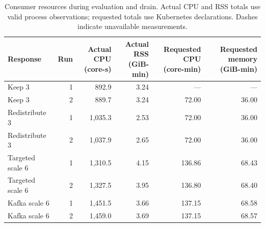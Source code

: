 \begin{table}[!htbp]
\centering\small
\setlength{\tabcolsep}{3pt}
\renewcommand{\arraystretch}{1.12}
\begin{tabular}{@{}lrrrrr@{}}
\toprule
Response & Run & \shortstack{Actual CPU\\(core-s)} & \shortstack{Actual RSS\\(GiB-min)} & \shortstack{Requested CPU\\(core-min)} & \shortstack{Requested memory\\(GiB-min)}\\
\midrule
Keep 3 & 1 & 892.9 & 3.24 & --- & ---\\
Keep 3 & 2 & 889.7 & 3.24 & 72.00 & 36.00\\
Redistribute 3 & 1 & 1,035.3 & 2.53 & 72.00 & 36.00\\
Redistribute 3 & 2 & 1,037.9 & 2.65 & 72.00 & 36.00\\
Targeted scale 6 & 1 & 1,310.5 & 4.15 & 136.86 & 68.43\\
Targeted scale 6 & 2 & 1,327.5 & 3.95 & 136.80 & 68.40\\
Kafka scale 6 & 1 & 1,451.5 & 3.66 & 137.15 & 68.58\\
Kafka scale 6 & 2 & 1,459.0 & 3.69 & 137.15 & 68.57\\
\bottomrule
\end{tabular}
\caption{Consumer resources during evaluation and drain. Actual CPU and RSS totals use valid process observations; requested totals use Kubernetes declarations. Dashes indicate unavailable measurements.}
\label{tab:twelve-partition-resources}\label{tab:four-condition-cost}
\end{table}

